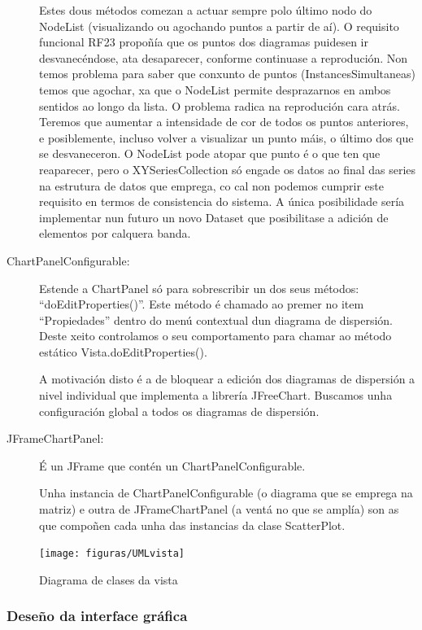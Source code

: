 \begin{description}
Estes dous métodos comezan a actuar sempre polo último nodo do NodeList (visualizando ou agochando puntos a partir de aí). O requisito funcional RF23 propoñía que os puntos dos diagramas puidesen ir desvanecéndose, ata desaparecer, conforme continuase a reprodución. Non temos problema para saber que conxunto de puntos (InstancesSimultaneas) temos que agochar, xa que o NodeList permite desprazarnos en ambos sentidos ao longo da lista. O problema radica na reprodución cara atrás. Teremos que aumentar a intensidade de cor de todos os puntos anteriores, e posiblemente, incluso volver a visualizar un punto máis, o último dos que se desvaneceron. O NodeList pode atopar que punto é o que ten que reaparecer, pero o XYSeriesCollection só engade os datos ao final das series na estrutura de datos que emprega, co cal non podemos cumprir este requisito en termos de consistencia do sistema. A única posibilidade sería implementar nun futuro un novo Dataset que posibilitase a adición de elementos por calquera banda.
\item[ChartPanelConfigurable:] \hfill
Estende a ChartPanel só para sobrescribir un dos seus métodos: ``doEditProperties()''. Este método é chamado ao premer no item ``Propiedades'' dentro do menú contextual dun diagrama de dispersión. Deste xeito controlamos o seu comportamento para chamar ao método estático Vista.doEditProperties().

A motivación disto é a de bloquear a edición dos diagramas de dispersión a nivel individual que implementa a librería JFreeChart. Buscamos unha configuración global a todos os diagramas de dispersión.

\item[JFrameChartPanel:] \hfill

É un JFrame que contén un ChartPanelConfigurable.

Unha instancia de ChartPanelConfigurable (o diagrama que se emprega na matriz) e outra de JFrameChartPanel (a ventá no que se amplía) son as que compoñen cada unha das instancias da clase ScatterPlot.

\end{description}

\begin{figure}
\centering
\centerline{\texttt{[image: figuras/UMLvista]}}
\caption{Diagrama de clases da vista}
\label{UMLvista}
\end{figure}

\subsubsection{Deseño da interface gráfica}

